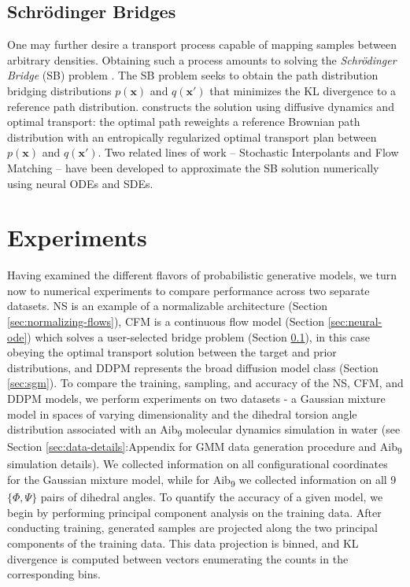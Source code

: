 \documentclass[%
 aip,
 amsmath,amssymb,
 reprint,%
]{revtex4-1}
\begin{document}
\subsection{Schr\"odinger Bridges}
\label{sec:sbm}

One may further desire a transport process capable of mapping samples between arbitrary densities. Obtaining such a process amounts to solving the {\it Schr\"odinger Bridge} (SB) problem \cite{schrodinger-1932,leonard-2014,debortoli-2021,chen-2021}. The SB problem seeks to obtain the path distribution bridging distributions $p(\mathbf{x})$ and $q(\mathbf{x}')$ that minimizes the KL divergence to a reference path distribution. \citet{follmer1988} constructs the solution using diffusive dynamics and optimal transport: the optimal path reweights a reference Brownian path distribution with an entropically regularized optimal transport plan between $p(\mathbf{x})$ and $q(\mathbf{x}')$\cite{leonard2013survey}. Two related lines of work -- Stochastic Interpolants \cite{stochastic-interpolants,nfs-with-si,si-with-couplings} and Flow Matching \cite{flow-matching,flow-matching-ot,sb-flow-matching} -- have been developed to approximate the SB solution numerically using neural ODEs and SDEs.

\section{Experiments}
\label{sec:experiments}

Having examined the different flavors of probabilistic generative models, we turn now to numerical experiments to compare performance across two separate datasets. NS is an example of a normalizable architecture (Section \ref{sec:normalizing-flows}), CFM is a continuous flow model (Section \ref{sec:neural-ode}) which solves a user-selected bridge problem (Section \ref{sec:sbm}), in this case obeying the optimal transport solution between the target and prior distributions, and DDPM represents the broad diffusion model class (Section \ref{sec:sgm}). To compare the training, sampling, and accuracy of the NS, CFM, and DDPM models, we perform experiments on two datasets - a Gaussian mixture model in spaces of varying dimensionality and the dihedral torsion angle distribution associated with an Aib\textsubscript{9} molecular dynamics simulation in water (see Section \ref{sec:data-details}:Appendix for GMM data generation procedure and Aib\textsubscript{9} simulation details). We collected information on all configurational coordinates for the Gaussian mixture model, while for Aib\textsubscript{9} we collected information on all 9 $\{\Phi, \Psi\}$ pairs of dihedral angles. To quantify the accuracy of a given model, we begin by performing principal component analysis on the training data. After conducting training, generated samples are projected along the two principal components of the training data. This data projection is binned, and KL divergence is computed between vectors enumerating the counts in the corresponding bins.
\end{document}
